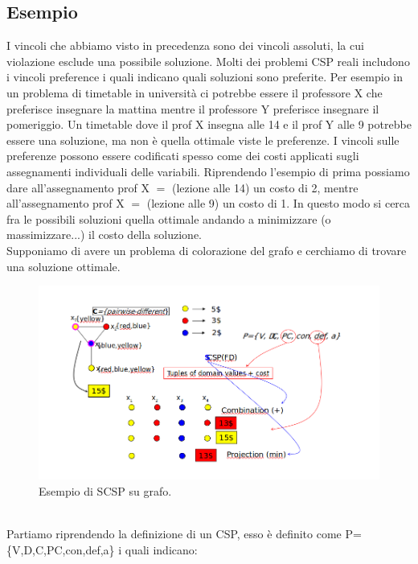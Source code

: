 \subsection{Esempio}
I vincoli che abbiamo visto in precedenza sono dei vincoli assoluti, la cui
violazione esclude una possibile soluzione. Molti dei problemi CSP reali
includono i vincoli preference i quali indicano quali soluzioni sono preferite.
Per esempio in un problema di timetable in università ci potrebbe essere il
professore X che preferisce insegnare la mattina mentre il professore Y
preferisce insegnare il pomeriggio. Un timetable dove il prof X insegna alle 14
e il prof Y alle 9 potrebbe essere una soluzione, ma non è quella ottimale viste
le preferenze. I vincoli sulle preferenze possono essere codificati spesso come
dei costi applicati sugli assegnamenti individuali delle variabili. Riprendendo
l'esempio di prima possiamo dare all'assegnamento prof X $=$ (lezione alle 14)
un costo di 2, mentre all'assegnamento prof X $=$ (lezione alle 9) un costo di
1. In questo modo si cerca fra le possibili soluzioni quella ottimale andando a
minimizzare (o massimizzare...) il costo della soluzione. \\Supponiamo di avere
un problema di colorazione del grafo e cerchiamo di trovare una soluzione
ottimale.
\begin{figure}[htp]
    \centering
    \includegraphics[width=14cm, keepaspectratio]{img/Cap4/scsp2.png}
    \caption{Esempio di SCSP su grafo.}
\end{figure}
\\Partiamo riprendendo la definizione di un CSP, esso è definito come
P=\{V,D,C,PC,con,def,a\} i quali indicano:
